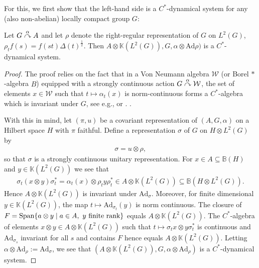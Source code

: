 For this, we first show that the left-hand side is a $C^*$-dynamical system for any (also non-abelian) locally compact group $G$:
\begin{proposition}
Let $G \stackrel{\alpha}{\curvearrowright} A$ and let $\rho$ denote the right-regular representation of $G$ on $L^2(G)$, $\rho_t f(s) = f(st) \Delta(t)^{\frac12}$. Then $A \otimes \mathbb{K}(L^2(G)), G, \alpha \otimes \mathrm{Ad} \rho)$ is a $C^*$-dynamical system.
\end{proposition}
\begin{proof}
The proof relies on the fact that in a Von Neumann algebra $\mathcal{W}$ (or Borel $*$-algebra $B$) equipped with a strongly continuous action $G \stackrel{\alpha}{\curvearrowright} \mathcal{W}$, the set of elements $x \in \mathcal{W}$ such that $t \mapsto \alpha_t(x)$ is norm-continuous forms a $C^*$-algebra which is invariant under $G$, see e.g., \cite[Proof of Lemma 7.5.1]{pedersenalgauto} or \cite[Proposition III.3.2.4]{blackadar}. .

With this in mind, let $(\pi,u)$ be a covariant representation of $(A, G, \alpha)$ on a Hilbert space $H$ with $\pi$ faithful. Define a representation $\sigma$ of $G$ on $H \otimes L^2(G)$ by
\begin{align*}
\sigma = u \otimes \rho,
\end{align*}
so that $\sigma$ is a strongly continuous unitary representation. For $x \in A \subseteq \mathbb{B}(H)$ and $y \in \mathbb{K}(L^2(G))$ we see that
\begin{align*}
	\sigma_t (x \otimes y) \sigma_t^* = \alpha_t(x) \otimes \rho_t y \rho_t^* \in A \otimes \mathbb{K}(L^2(G)) \subseteq \mathbb{B}(H \otimes L^2(G)).
\end{align*}
Hence $A \otimes \mathbb{K}(L^2(G))$ is invariant under $\mathrm{Ad}_\sigma$. Moreover, for finite dimensional $y \in \mathbb{K}(L^2(G))$, the map $t \mapsto \mathrm{Ad}_{\sigma_t}(y)$ is norm continuous. The closure of $F = \mathrm{Span}\{a \otimes y \mid a \in A, \ y \text{ finite rank}\}$ equals $A \otimes \mathbb{K}(L^2(G))$. The $C^*$-algebra of elements $x\otimes y \in A \otimes \mathbb{K}(L^2(G))$ such that $t \mapsto \sigma_t x \otimes y\sigma_t^*$ is continuous and $\mathrm{Ad}_{\sigma_s}$ invariant for all $s$ and contains $F$ hence equals $A \otimes \mathbb{K}(L^2(G))$. Letting $\alpha \otimes \mathrm{Ad}_\rho := \mathrm{Ad}_{\sigma}$, we see that $(A \otimes \mathbb{K}(L^2(G)), G , \alpha \otimes \mathrm{Ad}_\rho)$ is a $C^*$-dynamical system.
\end{proof}

